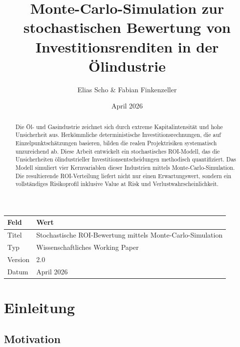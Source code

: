 \documentclass[11pt,a4paper]{article}
\title{\textbf{Monte-Carlo-Simulation zur stochastischen Bewertung von Investitionsrenditen in der Ölindustrie}}
\author{Elias Scho & Fabian Finkenzeller}
\date{April 2026}
\begin{document}
\maketitle
\thispagestyle{empty}
\begin{center}
\begin{tabular}{ll}
\toprule
\textbf{Feld}    & \textbf{Wert} \\
\midrule
Titel       & Stochastische ROI-Bewertung mittels Monte-Carlo-Simulation \\
Typ         & Wissenschaftliches Working Paper \\
Version     & 2.0 \\
Datum       & April 2026 \\
\bottomrule
\end{tabular}
\end{center}

\vspace{1.5cm}

\begin{abstract}\noindent
Die Öl- und Gasindustrie zeichnet sich durch extreme Kapitalintensität und hohe Unsicherheit aus. Herkömmliche deterministische Investitionsrechnungen, die auf Einzelpunktschätzungen basieren, bilden die realen Projektrisiken systematisch unzureichend ab. Diese Arbeit entwickelt ein stochastisches ROI-Modell, das die Unsicherheiten ölindustrieller Investitionsentscheidungen methodisch quantifiziert. Das Modell simuliert vier Kernvariablen dieser Industrien mittels Monte-Carlo-Simulation. Die resultierende ROI-Verteilung liefert nicht nur einen Erwartungswert, sondern ein vollständiges Risikoprofil inklusive Value at Risk und Verlustwahrscheinlichkeit.
\end{abstract}

\newpage
\tableofcontents
\newpage

\section{Einleitung}

\subsection{Motivation}
\end{document}
